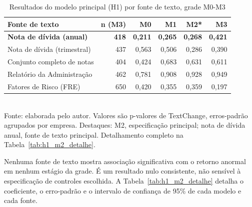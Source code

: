\documentclass[a4paper,12pt]{report}
\begin{document}
\begin{table}[htbp]
    \centering
    \caption{Resultados do modelo principal (H1) por fonte de texto, grade M0-M3}
    \label{tab:h1}
    \small
    \begin{tabular}{@{}lrrrrr@{}}
        \toprule
        \textbf{Fonte de texto} & \textbf{n (M3)} & \textbf{M0} & \textbf{M1} & \cellcolor{m2principal}\textbf{M2*} & \textbf{M3} \\
        \midrule
        \rowcolor{fontechave}
        \textbf{Nota de dívida (anual)}       & \textbf{418} & \textbf{0,211} & \textbf{0,265} & \cellcolor{m2intersecao}\textbf{0,268} & \textbf{0,421} \\
        Nota de dívida (trimestral)  & 437 & 0,563 & 0,506 & \cellcolor{m2principal}0,286 & 0,390 \\
        Conjunto completo de notas   & 404 & 0,424 & 0,683 & \cellcolor{m2principal}0,631 & 0,611 \\
        Relatório da Administração   & 462 & 0,781 & 0,908 & \cellcolor{m2principal}0,928 & 0,949 \\
        Fatores de Risco (FRE)       & 650 & 0,420 & 0,355 & \cellcolor{m2principal}0,359 & 0,197 \\
        \bottomrule
    \end{tabular}
    \\[0.3cm]
    {\footnotesize Fonte: elaborada pelo autor. Valores são p-valores de TextChange, erros-padrão agrupados por empresa. Destaques: M2, especificação principal; nota de dívida anual, fonte de texto principal. Detalhamento completo na Tabela~\ref{tab:h1_m2_detalhe}.}
\end{table}

Nenhuma fonte de texto mostra associação significativa com o retorno anormal em nenhum estágio da grade. É um resultado nulo consistente, não sensível à especificação de controles escolhida. A Tabela~\ref{tab:h1_m2_detalhe} detalha o coeficiente, o erro-padrão e o intervalo de confiança de 95\% de cada modelo e cada fonte.
\end{document}

